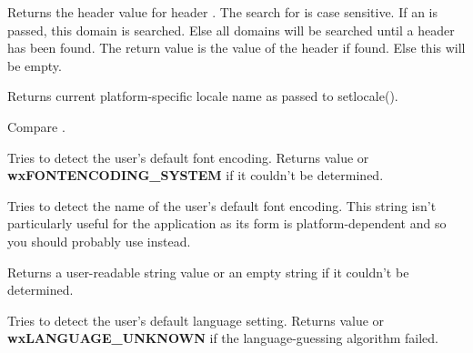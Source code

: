 Returns the header value for header . The search for  is case sensitive. If an 
is passed, this domain is searched. Else all domains will be searched until a header has been found.
The return value is the value of the header if found. Else this will be empty.

\label{wxlocalegetsysname}


Returns current platform-specific locale name as passed to setlocale().

Compare .



\label{wxlocalegetsystemencoding}


Tries to detect the user's default font encoding.
Returns  value or 
{\bf wxFONTENCODING\_SYSTEM} if it couldn't be determined.


\label{wxlocalegetsystemencodingname}


Tries to detect the name of the user's default font encoding. This string isn't
particularly useful for the application as its form is platform-dependent and
so you should probably use 
 instead.

Returns a user-readable string value or an empty string if it couldn't be
determined.


\label{wxlocalegetsystemlanguage}


Tries to detect the user's default language setting.
Returns  value or 
 {\bf wxLANGUAGE\_UNKNOWN} if the language-guessing algorithm failed.



\label{wxlocaleinit}



